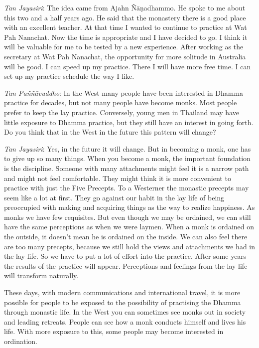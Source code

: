 \emph{Tan Jayasiri}: The idea came from Ajahn Ñāṇadhammo. He spoke to me
about this two and a half years ago. He said that the monastery there is
a good place with an excellent teacher. At that time I wanted to
continue to practice at Wat Pah Nanachat. Now the time is appropriate
and I have decided to go. I think it will be valuable for me to be
tested by a new experience. After working as the secretary at Wat Pah
Nanachat, the opportunity for more solitude in Australia will be good. I
can speed up my practice. There I will have more free time. I can set up
my practice schedule the way I like. 

\emph{Tan Paññāvuddho}: In the West many people have been interested in
Dhamma practice for decades, but not many people have become monks. Most
people prefer to keep the lay practice. Conversely, young men in
Thailand may have little exposure to Dhamma practice, but they still
have an interest in going forth. Do you think that in the West in the
future this pattern will change? 

\emph{Tan Jayasiri}: Yes, in the future it will change. But in becoming
a monk, one has to give up so many things. When you become a monk, the
important foundation is the discipline. Someone with many attachments
might feel it is a narrow path and might not feel comfortable. They
might think it is more convenient to practice with just the Five
Precepts. To a Westerner the monastic precepts may seem like a lot at
first. They go against our habit in the lay life of being preoccupied
with making and acquiring things as the way to realize happiness. As
monks we have few requisites. But even though we may be ordained, we can
still have the same perceptions as when we were laymen. When a monk is
ordained on the outside, it doesn't mean he is ordained on the inside. 
We can also feel there are too many precepts, because we still hold the
views and attachments we had in the lay life. So we have to put a lot of
effort into the practice. After some years the results of the practice
will appear. Perceptions and feelings from the lay life will transform
naturally. 

These days, with modern communications and international travel, it is
more possible for people to be exposed to the possibility of practising
the Dhamma through monastic life. In the West you can sometimes see
monks out in society and leading retreats. People can see how a monk
conducts himself and lives his life. With more exposure to this, some
people may become interested in ordination. 

